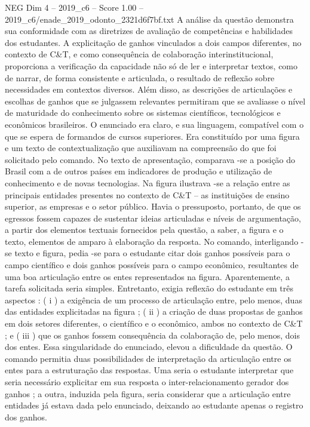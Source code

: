 \begin{textsample}{NEG Dim 4 – 2019\_c6 – Score 1.00 – 2019\_c6/enade\_2019\_odonto\_2321d6f7bf.txt}
A análise da questão demonstra sua conformidade com as diretrizes de avaliação de competências e habilidades dos estudantes.
A explicitação de ganhos vinculados a dois campos diferentes, no contexto de C\&T, e como consequência de colaboração interinstitucional, proporciona a verificação da capacidade não só de ler e interpretar textos, como de narrar, de forma consistente e articulada, o resultado de reflexão sobre necessidades em contextos diversos.
Além disso, as descrições de articulações e escolhas de ganhos que se julgassem relevantes permitiram que se avaliasse o nível de maturidade do conhecimento sobre os sistemas científicos, tecnológicos e econômicos brasileiros.
O enunciado era claro, e sua linguagem, compatível com o que se espera de formandos de cursos superiores.
Era constituído por uma figura e um texto de contextualização que auxiliavam na compreensão do que foi solicitado pelo comando.
No texto de apresentação, comparava -se a posição do Brasil com a de outros países em indicadores de produção e utilização de conhecimento e de novas tecnologias.
Na figura ilustrava -se a relação entre as principais entidades presentes no contexto de C\&T – as instituições de ensino superior, as empresas e o setor público.
Havia o pressuposto, portanto, de que os egressos fossem capazes de sustentar ideias articuladas e níveis de argumentação, a partir dos elementos textuais fornecidos pela questão, a saber, a figura e o texto, elementos de amparo à elaboração da resposta.
No comando, interligando -se texto e figura, pedia -se para o estudante citar dois ganhos possíveis para o campo científico e dois ganhos possíveis para o campo econômico, resultantes de uma boa articulação entre os entes representados na figura.
Aparentemente, a tarefa solicitada seria simples.
Entretanto, exigia reflexão do estudante em três aspectos : ( i ) a exigência de um processo de articulação entre, pelo menos, duas das entidades explicitadas na figura ; ( ii ) a criação de duas propostas de ganhos em dois setores diferentes, o científico e o econômico, ambos no contexto de C\&T ; e ( iii ) que os ganhos fossem consequência da colaboração de, pelo menos, dois dos entes.
Essa singularidade do enunciado, elevou a dificuldade da questão.
O comando permitia duas possibilidades de interpretação da articulação entre os entes para a estruturação das respostas.
Uma seria o estudante interpretar que seria necessário explicitar em sua resposta o inter-relacionamento gerador dos ganhos ; a outra, induzida pela figura, seria considerar que a articulação entre entidades já estava dada pelo enunciado, deixando ao estudante apenas o registro dos ganhos.

\end{textsample}
